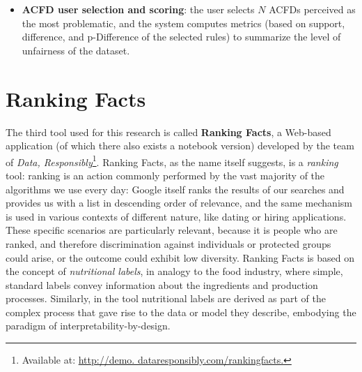 \begin{itemize}
\item \textbf{ACFD user selection and scoring}: the user selects \(N\) ACFDs perceived as the most problematic, and the system computes metrics (based on support, difference, and p-Difference of the selected rules) to summarize the level of unfairness of the dataset.
\end{itemize}


\section{Ranking Facts}
\label{section:ranking_facts}
The third tool used for this research is called \textbf{Ranking Facts}, a Web-based application (of which there also exists a notebook version) developed by the team of \textit{Data, Responsibly}\footnote{Available at: \url{http://demo. dataresponsibly.com/rankingfacts.}}. Ranking Facts, as the name itself suggests, is a \textit{ranking} tool: ranking is an action commonly performed by the vast majority of the algorithms we use every day: Google itself ranks the results of our searches and provides us with a list in descending order of relevance, and the same mechanism is used in various contexts of different nature, like dating or hiring applications. These specific scenarios are particularly relevant, because it is people who are ranked, and therefore discrimination against individuals or protected groups could arise, or the outcome could exhibit low diversity. Ranking Facts is based on the concept of \textit{nutritional labels}, in analogy to the food industry, where simple, standard labels convey information about the ingredients and production processes. Similarly, in the tool nutritional labels are derived as part of the complex process that gave rise to the data or model they describe, embodying the paradigm of interpretability-by-design.

